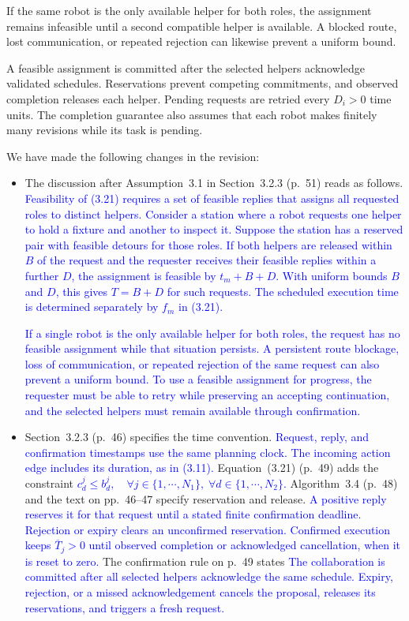 \documentclass[11pt]{article}
\newcommand{\change}[1]{\textcolor{blue}{#1}}
\begin{document}
If the same robot is the only available helper for both roles, the assignment
remains infeasible until a second compatible helper is available. A blocked route, lost
communication, or repeated rejection can likewise prevent a uniform bound.

A feasible assignment is committed after the selected helpers acknowledge
validated schedules. Reservations prevent competing commitments, and observed
completion releases each helper. Pending requests are retried every $D_i>0$
time units. The completion guarantee also assumes that each robot makes
finitely many revisions while its task is pending.

We have made the following changes in the revision:
\begin{itemize}
\item The discussion after Assumption~3.1 in Section~3.2.3 (p.~51) reads as follows.
\change{Feasibility of (3.21) requires a set of feasible replies that
assigns all requested roles to distinct helpers. Consider a station where
a robot requests one helper to hold a fixture and another to inspect it.
Suppose the station has a reserved pair with feasible detours for those roles.
If both helpers are released within $B$ of the request and the requester
receives their feasible replies within a further $D$, the assignment
is feasible by $t_m+B+D$. With uniform bounds $B$ and $D$, this gives
$T=B+D$ for such requests. The scheduled execution time is determined
separately by $f_m$ in (3.21).}

\change{If a single robot is the only available helper for both roles, the request
has no feasible assignment while that situation persists. A persistent route
blockage, loss of communication, or repeated rejection of the same request
can also prevent a uniform bound. To use a feasible assignment for progress,
the requester must be able to retry while preserving an accepting continuation,
and the selected helpers must remain available through confirmation.}

\item Section~3.2.3 (p.~46) specifies the time convention.
\change{Request, reply, and confirmation timestamps use the same planning clock.
The incoming action edge includes its duration, as in (3.11).}
Equation~(3.21) (p.~49) adds the constraint
\change{$c_d^j\le b_d^j,\quad\forall j\in\{1,\cdots,N_1\},\;\forall
d\in\{1,\cdots,N_2\}$.}
Algorithm~3.4 (p.~48) and the text on pp.~46--47 specify reservation and release.
\change{A positive reply reserves it for that request until a stated finite
confirmation deadline. Rejection or expiry clears an unconfirmed reservation.
Confirmed execution keeps $\overline{T}_j>0$ until observed completion or
acknowledged cancellation, when it is reset to zero.}
The confirmation rule on p.~49 states
\change{The collaboration is committed after all selected helpers acknowledge
the same schedule. Expiry, rejection, or a missed acknowledgement cancels
the proposal, releases its reservations, and triggers a fresh request.}


\end{itemize}
\end{document}
